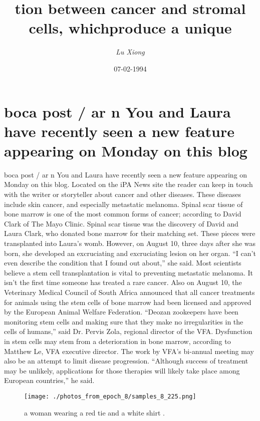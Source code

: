 \documentclass{article}%
\title{tion between cancer and stromal cells, whichproduce a unique}%
\author{\textit{Lu Xiong}}%
\date{07-02-1994}%
\begin{document}
%
\normalsize%
\maketitle%
\section{boca post / ar n\newline%
You and Laura have recently seen a new feature appearing on Monday on this blog}%
\label{sec:bocapost/arnYouandLaurahaverecentlyseenanewfeatureappearingonMondayonthisblog}%
boca post / ar n\newline%
You and Laura have recently seen a new feature appearing on Monday on this blog. Located on the iPA News site the reader can keep in touch with the writer or storyteller about cancer and other diseases. These diseases include skin cancer, and especially metastatic melanoma.\newline%
Spinal scar tissue of bone marrow is one of the most common forms of cancer; according to David Clark of The Mayo Clinic.\newline%
Spinal scar tissue was the discovery of David and Laura Clark, who donated bone marrow for their matching set. These pieces were transplanted into Laura’s womb.\newline%
However, on August 10, three days after she was born, she developed an excruciating and excruciating lesion on her organ.\newline%
“I can’t even describe the condition that I found out about,” she said.\newline%
Most scientists believe a stem cell transplantation is vital to preventing metastatic melanoma. It isn’t the first time someone has treated a rare cancer.\newline%
Also on August 10, the Veterinary Medical Council of South Africa announced that all cancer treatments for animals using the stem cells of bone marrow had been licensed and approved by the European Animal Welfare Federation.\newline%
“Deozan zookeepers have been monitoring stem cells and making sure that they make no irregularities in the cells of humans,” said Dr. Pervis Zola, regional director of the VFA.\newline%
Dysfunction in stem cells may stem from a deterioration in bone marrow, according to Matthew Le, VFA executive director. The work by VFA’s bi{-}annual meeting may also be an attempt to limit disease progression.\newline%
“Although success of treatment may be unlikely, applications for those therapies will likely take place among European countries,” he said.\newline%

%


\begin{figure}[h!]%
\centering%
\texttt{[image: ./photos\_from\_epoch\_8/samples\_8\_225.png]}%
\caption{a woman wearing a red tie and a white shirt .}%
\end{figure}

%
\end{document}
